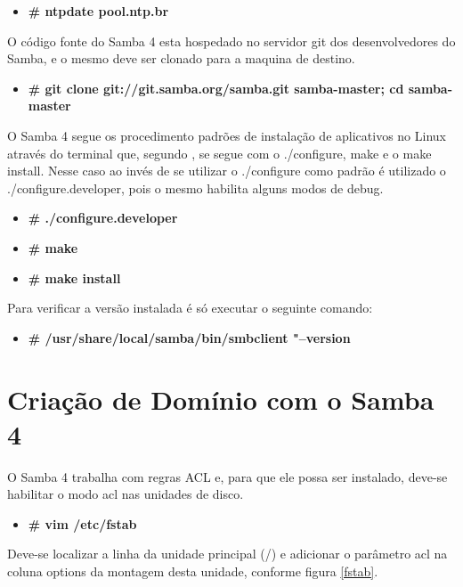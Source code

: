 \begin{itemize}
	\item \textbf{\# ntpdate pool.ntp.br}
\end{itemize}

O código fonte do Samba 4 esta hospedado no servidor git dos desenvolvedores do Samba, e o mesmo deve ser clonado para a maquina de destino.

\begin{itemize}
	\item \textbf{\# git clone git://git.samba.org/samba.git samba-master; cd samba-master}
\end{itemize}

O Samba 4 segue os procedimento padrões de instalação de aplicativos no Linux através do terminal que, segundo \cite{INSTALL}, se segue com o ./configure, make e o make install. Nesse caso ao invés de se utilizar o ./configure como padrão é utilizado o ./configure.developer, pois o mesmo habilita alguns modos de debug.

\begin{itemize}
		\item \textbf{\# ./configure.developer}
		\item \textbf{\# make}
		\item \textbf{\# make install}
\end{itemize}

Para verificar a versão instalada é só executar o seguinte comando:

\begin{itemize}
	\item \textbf{\# /usr/share/local/samba/bin/smbclient "--version}
\end{itemize}

\section{Criação de Domínio com o Samba 4}

O Samba 4 trabalha com regras ACL e, para que ele possa ser instalado, deve-se habilitar o modo acl nas unidades de disco.

\begin{itemize}
	\item \textbf{\# vim /etc/fstab}
\end{itemize}

Deve-se localizar a linha da unidade principal (/) e adicionar o parâmetro acl na coluna options da montagem desta unidade, conforme figura \ref{fstab}.

